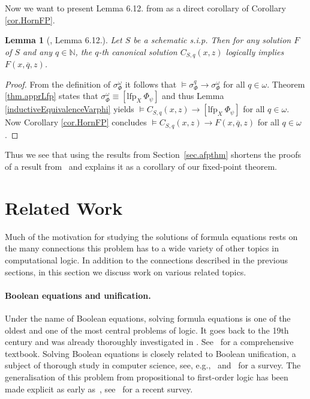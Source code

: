 \documentclass[acmsmall]{acmart}
\theoremstyle{plain}
\newtheorem{lemma}[theorem]{Lemma}
\theoremstyle{definition}
\newcommand{\mybar}[1]{\overline{#1}}
\newcommand{\Nat}{\mathbb{N}}
\newcommand{\lfp}{\mathrm{lfp}} %
\begin{document}
Now we want to present Lemma 6.12. from \cite{Eberhard15Inductive} as a direct corollary of Corollary \ref{cor.HornFP}. 

\begin{lemma}[\cite{Eberhard15Inductive}, Lemma 6.12.]
	Let $S$ be a schematic s.i.p. Then for any solution $F$ of $S$ and any $q \in \Nat$, the $q$-th canonical solution $C_{S,q}(x,z)$ logically implies $F(x,\mybar{q},z)$.
\end{lemma}
\begin{proof}
	From the definition of $\sigma_{\Phi}^{\omega}$ it follows that $\models \sigma_{\Phi}^q \rightarrow \sigma_{\Phi}^{\omega}$ for all $q \in \omega$. Theorem \ref{thm.apprLfp} states that $\sigma_{\Phi}^{\omega} \equiv [\lfp_X~ \Phi_{\psi}]$ and thus Lemma \ref{inductiveEquivalenceVarphi} yields $\models  C_{S,q}(x,z) \rightarrow [\lfp_X~ \Phi_{\psi}]$ for all $q \in \omega$. Now Corollary \ref{cor.HornFP} concludes $\models C_{S,q}(x,z) \rightarrow F(x,\mybar{q},z)$ for all $q \in \omega$.
\end{proof}

Thus we see that using the results from Section~\ref{sec.afpthm} shortens the proofs of a result
 from~\cite{Eberhard15Inductive} and explains it as a corollary of our fixed-point theorem.


\section{Related Work}\label{sec.related_work}

Much of the motivation for studying the solutions of formula equations rests on the many
 connections this problem has to a wide variety of other topics in computational logic.
In addition to the connections described in the previous sections, in this section
 we discuss work on various related topics.

\paragraph{Boolean equations and unification.}
%
Under the name of Boolean equations, solving formula equations is one of the oldest
 and one of the most central problems of logic.
It goes back to the 19th century and was already thoroughly investigated
 in \cite{Schroeder90Vorlesungen}.
See~\cite{Rudeanu74Boolean} for a comprehensive textbook.
Solving Boolean equations is closely related to Boolean unification, a subject of
 thorough study in computer science, see, e.g.,~\cite{Baader98Complexity,Buettner87Embedding,Martin88Unification}
 and~\cite{Martin89Boolean} for a survey.
The generalisation of this problem from propositional to first-order logic has been
 made explicit as early
 as~\cite{Behmann50Aufloesungsproblem,Behmann51Aufloesungsproblem},
 see~\cite{Wernhard17Boolean} for a recent survey.
\end{document}

